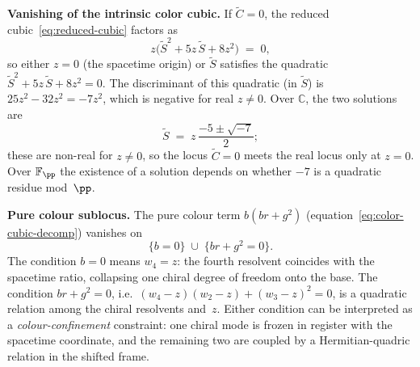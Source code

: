 \begin{remark}[Sublocus $\widetilde{C}=0$ and colour confinement]
\label{rem:color-tube-subloci}
  \textbf{Vanishing of the intrinsic color cubic.}\;
  If $\widetilde{C} = 0$, the reduced cubic~\eqref{eq:reduced-cubic}
  factors as
  \begin{equation}\label{eq:reduced-cubic-factored}
    z\bigl(\widetilde{S}^2 + 5z\,\widetilde{S} + 8z^2\bigr) \;=\; 0,
  \end{equation}
  so either $z = 0$ (the spacetime origin) or $\widetilde{S}$ satisfies
  the quadratic $\widetilde{S}^2 + 5z\,\widetilde{S} + 8z^2 = 0$.
  The discriminant of this quadratic (in $\widetilde{S}$) is
  $25z^2 - 32z^2 = -7z^2$, which is negative for real $z \ne 0$.
  Over $\mathbb{C}$, the two solutions are
  \[
    \widetilde{S} \;=\; z\,\frac{-5 \pm \sqrt{-7}}{2};
  \]
  these are non-real for $z \ne 0$, so the locus $\widetilde{C} = 0$
  meets the real locus only at $z = 0$.  Over $\mathbb{F}_\pp$ the
  existence of a solution depends on whether $-7$ is a quadratic
  residue mod~$\pp$.

  \medskip
  \noindent\textbf{Pure colour sublocus.}\;
  The pure colour term $b(br + g^2)$
  (equation~\eqref{eq:color-cubic-decomp}) vanishes on
  \[
    \{b = 0\} \;\cup\; \{br + g^2 = 0\}.
  \]
  The condition $b = 0$ means $w_4 = z$: the fourth resolvent
  coincides with the spacetime ratio, collapsing one chiral degree of
  freedom onto the base.  The condition $br + g^2 = 0$, i.e.\
  $(w_4 - z)(w_2 - z) + (w_3 - z)^2 = 0$, is a quadratic relation
  among the chiral resolvents and~$z$.  Either condition can be
  interpreted as a \emph{colour-confinement} constraint: one chiral
  mode is frozen in register with the spacetime coordinate, and the
  remaining two are coupled by a Hermitian-quadric relation in the
  shifted frame.
\end{remark}

